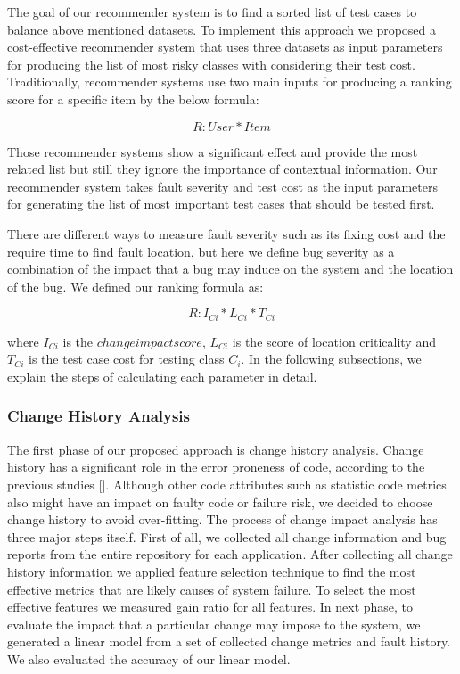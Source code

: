 The goal of our recommender system is to find a sorted list of test cases 
to balance above mentioned datasets. 
To implement this approach we proposed a cost-effective recommender system that uses three
datasets as input parameters for producing the list of most risky classes with considering 
their test cost. 
Traditionally, recommender systems use two main inputs for 
producing a ranking score for a specific item by the below formula:
  
\[
{R : User * Item }
\] 
 
Those recommender systems show a significant effect and  
provide the most related list but still they ignore the importance 
of contextual information. 
Our recommender system takes fault severity and test cost as the
input parameters for generating the
list of most important test cases that should be tested first. 


There are different ways to measure fault severity such as its fixing cost and 
the require time to find fault location, but
here we define bug severity as a combination
of the impact that a bug may induce on the system and the location of the bug. 
We defined our ranking formula as:

\[
{R : I_{Ci} * L_{Ci} * T_{Ci} }
\] 

where $I_{Ci}$ is the $change impact score$, $L_{Ci}$ is the 
score of location criticality and $T_{Ci}$ is the test case cost for testing class $C_{i}$. 
In the following subsections, we explain the steps of calculating each parameter 
in detail. 

\subsubsection{Change History Analysis}

The first phase of our proposed approach is change history
analysis. Change history has a significant role in the error proneness of code, 
according to the previous studies []. 
Although other code attributes such as statistic code metrics also might 
have an impact on faulty code or failure risk, we decided to choose
change history to avoid over-fitting. 
The process of change impact analysis has three major steps itself. 
First of all, we collected all change information and bug reports from the 
entire repository for each application. 
After collecting all change history information we applied feature selection
technique to find the most effective metrics that are likely causes of system failure. 
To select the most effective features we measured gain ratio for all features. 
In next phase, to evaluate the impact that a particular change may 
impose to the system, we generated a linear model from a set of collected 
change metrics and fault history. We also evaluated the accuracy of our linear model. 
	
